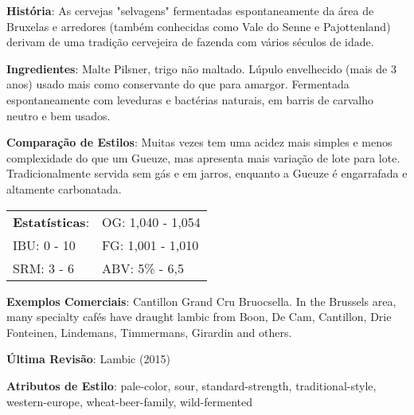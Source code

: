 \textbf{História}: As cervejas "selvagens" fermentadas espontaneamente da área de Bruxelas e arredores (também conhecidas como Vale do Senne e Pajottenland) derivam de uma tradição cervejeira de fazenda com vários séculos de idade.

\textbf{Ingredientes}: Malte Pilsner, trigo não maltado. Lúpulo envelhecido (mais de 3 anos) usado mais como conservante do que para amargor. Fermentada espontaneamente com leveduras e bactérias naturais, em barris de carvalho neutro e bem usados.

\textbf{Comparação de Estilos}: Muitas vezes tem uma acidez mais simples e menos complexidade do que um Gueuze, mas apresenta mais variação de lote para lote. Tradicionalmente servida sem gás e em jarros, enquanto a Gueuze é engarrafada e altamente carbonatada.

\begin{tabular}{@{}p{35mm}p{35mm}@{}}
  \textbf{Estatísticas}: & OG: 1,040 - 1,054 \\
  IBU: 0 - 10  & FG: 1,001 - 1,010  \\
  SRM: 3 - 6  & ABV: 5\% - 6,5%
\end{tabular}

\textbf{Exemplos Comerciais}: Cantillon Grand Cru Bruocsella. In the Brussels area, many specialty cafés have draught lambic from Boon, De Cam, Cantillon, Drie Fonteinen, Lindemans, Timmermans, Girardin and others.

\textbf{Última Revisão}: Lambic (2015)

\textbf{Atributos de Estilo}: pale-color, sour, standard-strength, traditional-style, western-europe, wheat-beer-family, wild-fermented

